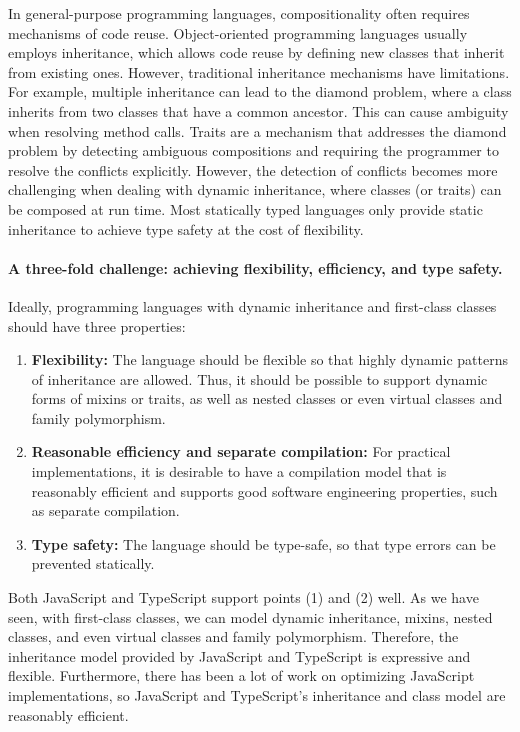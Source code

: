 In general-purpose programming languages, compositionality often requires
mechanisms of code reuse. Object-oriented programming languages usually employs
inheritance, which allows code reuse by defining new classes that inherit from
existing ones. However, traditional inheritance mechanisms have limitations. For
example, multiple inheritance can lead to the diamond problem, where a class
inherits from two classes that have a common ancestor. This can cause ambiguity
when resolving method calls. Traits are a mechanism that addresses the diamond
problem by detecting ambiguous compositions and requiring the programmer to
resolve the conflicts explicitly. However, the detection of conflicts becomes
more challenging when dealing with dynamic inheritance, where classes (or
traits) can be composed at run time. Most statically typed languages only
provide static inheritance to achieve type safety at the cost of flexibility.

\paragraph{A three-fold challenge: achieving flexibility, efficiency, and type safety.}
Ideally, programming languages with dynamic inheritance and first-class classes
should have three properties:

\begin{enumerate}

\item \textbf{Flexibility:} The language should be flexible so that highly
      dynamic patterns of inheritance are allowed. Thus, it should be possible
      to support dynamic forms of mixins or traits, as well as nested classes or
      even virtual classes and family polymorphism.

\item \textbf{Reasonable efficiency and separate compilation:} For practical
      implementations, it is desirable to have a compilation model that is
      reasonably efficient and supports good software engineering properties,
      such as separate compilation.

\item \textbf{Type safety:} The language should be type-safe, so that type
      errors can be prevented statically.

\end{enumerate}

\noindent
Both JavaScript and TypeScript support points (1) and (2) well. As we have seen,
with first-class classes, we can model dynamic inheritance, mixins, nested
classes, and even virtual classes and family polymorphism. Therefore, the
inheritance model provided by JavaScript and TypeScript is expressive and
flexible. Furthermore, there has been a lot of work on optimizing JavaScript
implementations, so JavaScript and TypeScript's inheritance and class model are
reasonably efficient.

